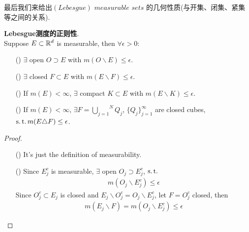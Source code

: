 	最后我们来给出$(Lebesgue) \,\, measurable \,\, sets$ 的几何性质(与开集、闭集、紧集等之间的关系).
	\begin{thm}\label{thm 1.3.4}
		\textbf{Lebesgue测度的正则性}. \\
		Suppose $E \subset \mathbb{R}^d$ is measurable, then $\forall \epsilon > 0 :$
		\begin{enumerate}
			\item[(\rmnum{1})]$\exists$ open $O \supset E$ with $m(O \backslash E) \leq \epsilon$.
			
			\item[(\rmnum{2})]$\exists$ closed $F \subset E$ with $m(E \backslash F) \leq \epsilon$.
			
			\item[(\rmnum{3})]If $m(E) < \infty$, $\exists$ compact $K \subset E$ with $m(E \backslash K) \leq \epsilon$.
			
			\item[(\rmnum{4})]If $m(E) < \infty$, $\exists F = \overset{N}{\underset{j = 1}{\bigcup}}{Q_j}$, $\{ Q_j \}_{j = 1}^\infty$ are closed cubes, $\operatorname{s.t.} m(E \triangle F) \leq \epsilon$.
		\end{enumerate}
		
		\vspace{2em}
		\begin{proof}
			\begin{enumerate}
				\item[(\rmnum{1})]It's just the definition of measurability.
				
				\item[(\rmnum{2})]Since $E_{j}^c$ is measurable, $\exists$ open $O_j \supset E_{j}^c$, $\operatorname{s.t.}$
				\begin{align}
					m(O_j \backslash E_{j}^c) \leq \epsilon
				\end{align}
				Since $O_{j}^c \subset E_j$ is closed and $E_j \backslash O_{j}^c = O_j \backslash E_{j}^c$, let $F = O_{j}^c$ closed, then
				\begin{align}
					m(E_j \backslash F) = m(O_j \backslash E_{j}^c) \leq \epsilon
				\end{align}
				

\end{enumerate}
\end{proof}
\end{thm}
